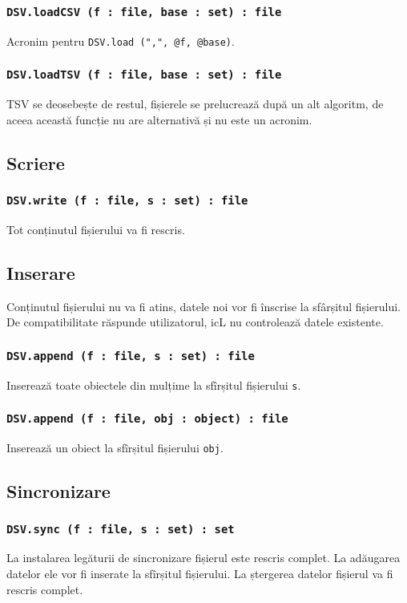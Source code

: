 \subsubsection{\texttt{DSV.loadCSV (f : file, base : set) : file}}

Acronim pentru \texttt{DSV.load (",", @f, @base)}.

\subsubsection{\texttt{DSV.loadTSV (f : file, base : set) : file}}

TSV se deosebește de restul, fișierele se prelucrează după un alt algoritm, de aceea această funcție nu are alternativă și nu este un acronim.

\subsection{Scriere}

\subsubsection{\texttt{DSV.write (f : file, s : set) : file}}

Tot conținutul fișierului va fi rescris.

\subsection{Inserare}

Conținutul fișierului nu va fi atins, datele noi vor fi înscrise la sfârșitul fișierului. De compatibilitate răspunde utilizatorul, icL nu controlează datele existente.

\subsubsection{\texttt{DSV.append (f : file, s : set) : file}}

Inserează toate obiectele din mulțime la sfîrșitul fișierului \texttt{s}.

\subsubsection{\texttt{DSV.append (f : file, obj : object) : file}}

Inserează un obiect la sfîrșitul fișierului \texttt{obj}.

\subsection{Sincronizare}

\subsubsection{\texttt{DSV.sync (f : file, s : set) : set}}

La instalarea legăturii de sincronizare fișierul este rescris complet. La adăugarea datelor ele vor fi inserate la sfîrșitul fișierului. La ștergerea datelor fișierul va fi rescris complet.

